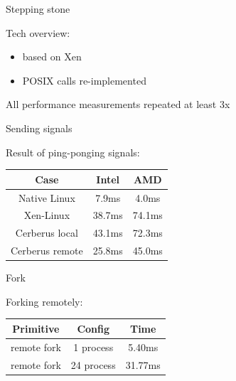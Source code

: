 \documentclass{beamer}
\begin{document}
	\begin{frame}{Stepping stone}
	
	Tech overview:
	\begin{itemize}
	\item based on Xen
	\item POSIX calls re-implemented
	\end{itemize}

	All performance measurements repeated at least 3x

	\end{frame}

	\begin{frame}{Sending signals}

		Result of ping-ponging signals:
		
		\begin{tabular}{|c|c|c|}
		\hline Case & Intel & AMD \\ 
		\hline Native Linux & 7.9ms & 4.0ms \\ 
		\hline Xen-Linux & 38.7ms & 74.1ms \\ 
		\hline Cerberus local & 43.1ms & 72.3ms \\ 
		\hline Cerberus remote & 25.8ms & 45.0ms \\ 
		\hline 
		\end{tabular} 
	
	\end{frame}
	
	\begin{frame}{Fork}

		Forking remotely:		
		
		\begin{tabular}{|c|c|c|}
		\hline Primitive & Config & Time \\ 
		\hline remote fork & 1 process & 5.40ms \\ 
		\hline remote fork & 24 process & 31.77ms \\ 		
		\hline 
		\end{tabular} 

	\end{frame}
	
\end{document}
